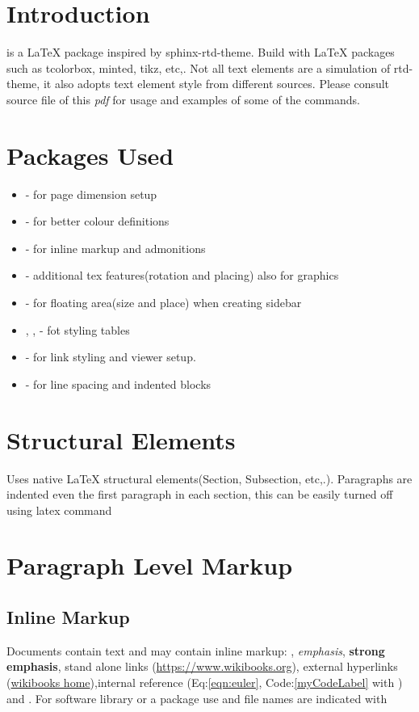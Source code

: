 \documentclass[12pt,a4paper]{report}
\begin{document}
\tableofcontents

\section{Introduction}
 is a {\LaTeX} package inspired by sphinx-rtd-theme. Build with {\LaTeX} packages such as tcolorbox, minted, tikz, etc,. Not all text elements are a simulation of rtd-theme, it also adopts text element style from different sources. Please consult  source file of this \emph{pdf} for usage and examples of some of the commands.
\section{Packages Used}
\begin{itemize}
	\item {} - for page dimension setup
	\item {} - for better colour definitions
	\item {} - for inline markup and admonitions
	\item {} - additional tex features(rotation and placing) also for graphics
	\item {} - for floating area(size and place) when creating sidebar
	\item {}, ,  - fot styling tables
	\item {} - for link styling and viewer setup.
	\item {} - for line spacing and indented blocks
\end{itemize}

\section{Structural Elements}
Uses native LaTeX structural elements(Section, Subsection, etc,.). Paragraphs are indented even the first paragraph in each section, this can be easily turned off using  latex command
\section{Paragraph Level Markup}

\subsection{Inline Markup}
Documents contain text and may contain inline markup: , \emph{emphasis}, \textbf{strong emphasis}, stand alone links (\url{https://www.wikibooks.org}), external hyperlinks (\href{https://www.wikibooks.org}{wikibooks home}),internal reference (Eq:\ref{eqn:euler}, Code:\ref{myCodeLabel} with ) and . For software library or a package use  and file names are indicated with 
\end{document}
